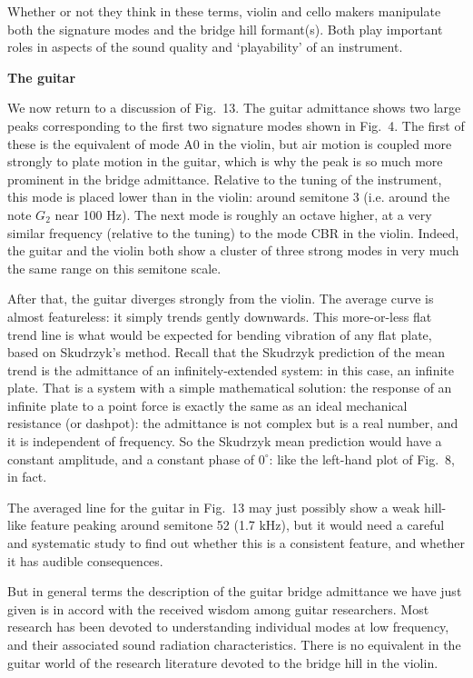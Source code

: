   Whether or not they think in these terms, violin and cello makers manipulate 
  both the signature modes and the bridge hill formant(s). Both play important 
  roles in aspects of the sound quality and `playability' of an instrument. 

  \textbf{The guitar} 

  We now return to a discussion of Fig.\ 13. The guitar admittance shows two 
  large peaks corresponding to the first two signature modes shown in Fig.\ 4. 
  The first of these is the equivalent of mode A0 in the violin, but air motion 
  is coupled more strongly to plate motion in the guitar, which is why the peak 
  is so much more prominent in the bridge admittance. Relative to the tuning of 
  the instrument, this mode is placed lower than in the violin: around semitone 
  3 (i.e. around the note $G_2$ near 100 Hz). The next mode is roughly an 
  octave higher, at a very similar frequency (relative to the tuning) to the 
  mode CBR in the violin. Indeed, the guitar and the violin both show a cluster 
  of three strong modes in very much the same range on this semitone scale. 

  After that, the guitar diverges strongly from the violin. The average curve 
  is almost featureless: it simply trends gently downwards. This more-or-less 
  flat trend line is what would be expected for bending vibration of any flat 
  plate, based on Skudrzyk's method. Recall that the Skudrzyk prediction of the 
  mean trend is the admittance of an infinitely-extended system: in this case, 
  an infinite plate. That is a system with a simple mathematical solution: the 
  response of an infinite plate to a point force is exactly the same as an 
  ideal mechanical resistance (or dashpot): the admittance is not complex but 
  is a real number, and it is independent of frequency. So the Skudrzyk mean 
  prediction would have a constant amplitude, and a constant phase of 
  $0^\circ$: like the left-hand plot of Fig.\ 8, in fact. 

  The averaged line for the guitar in Fig.\ 13 may just possibly show a weak 
  hill-like feature peaking around semitone 52 (1.7 kHz), but it would need a 
  careful and systematic study to find out whether this is a consistent 
  feature, and whether it has audible consequences. 

  But in general terms the description of the guitar bridge admittance we have 
  just given is in accord with the received wisdom among guitar researchers. 
  Most research has been devoted to understanding individual modes at low 
  frequency, and their associated sound radiation characteristics. There is no 
  equivalent in the guitar world of the research literature devoted to the 
  bridge hill in the violin. 

